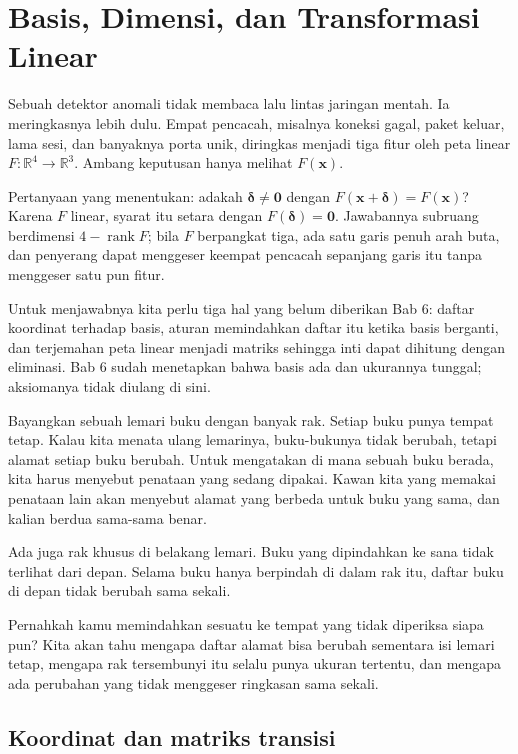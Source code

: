 \chapter{Basis, Dimensi, dan Transformasi Linear}

Sebuah detektor anomali tidak membaca lalu lintas jaringan mentah. Ia meringkasnya lebih
dulu. Empat pencacah, misalnya koneksi gagal, paket keluar, lama sesi, dan banyaknya porta
unik, diringkas menjadi tiga fitur oleh peta linear
$F\colon\mathbb{R}^{4}\to\mathbb{R}^{3}$.
Ambang keputusan hanya melihat $F(\mathbf{x})$.

Pertanyaan yang menentukan: adakah $\boldsymbol{\delta}\neq\mathbf{0}$ dengan
$F(\mathbf{x}+\boldsymbol{\delta})=F(\mathbf{x})$? Karena $F$ linear, syarat itu setara
dengan
$F(\boldsymbol{\delta})=\mathbf{0}$. Jawabannya subruang berdimensi
$4-\operatorname{rank}F$; bila $F$ berpangkat tiga, ada satu garis penuh arah buta, dan
penyerang dapat menggeser keempat pencacah sepanjang garis itu tanpa menggeser satu pun
fitur.

Untuk menjawabnya kita perlu tiga hal yang belum diberikan Bab 6: daftar koordinat terhadap
basis, aturan memindahkan daftar itu ketika basis berganti, dan terjemahan peta linear
menjadi matriks sehingga inti dapat dihitung dengan eliminasi. Bab 6 sudah menetapkan bahwa
basis ada dan ukurannya tunggal; aksiomanya tidak diulang di sini.

\begin{untukanak}
Bayangkan sebuah lemari buku dengan banyak rak. Setiap buku punya tempat tetap. Kalau kita
menata ulang lemarinya, buku-bukunya tidak berubah, tetapi alamat setiap buku berubah. Untuk
mengatakan di mana sebuah buku berada, kita harus menyebut penataan yang sedang dipakai.
Kawan kita yang memakai penataan lain akan menyebut alamat yang berbeda untuk buku yang
sama,
dan kalian berdua sama-sama benar.

Ada juga rak khusus di belakang lemari. Buku yang dipindahkan ke sana tidak terlihat dari
depan. Selama buku hanya berpindah di dalam rak itu, daftar buku di depan tidak berubah sama
sekali.

Pernahkah kamu memindahkan sesuatu ke tempat yang tidak diperiksa siapa pun? Kita akan tahu
mengapa daftar alamat bisa berubah sementara isi
lemari tetap, mengapa rak tersembunyi itu selalu punya ukuran tertentu, dan mengapa ada
perubahan yang tidak menggeser ringkasan sama sekali.
\end{untukanak}

\section{Koordinat dan matriks transisi}


